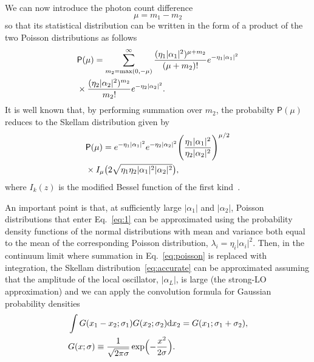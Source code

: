 \documentclass[%
reprint,
superscriptaddress,
 amsmath,amssymb,amsfonts,
 aps,
 pra,
 longbibliography
]{revtex4-2}
\newcommand{\prob}{\mathsf{P}}
\newcommand{\dd}{\mathrm{d}}
\begin{document}
We can now introduce the photon count difference
\begin{equation}
  \label{eq:dleta-m}
    \mu = m_1-m_2
  \end{equation}
  so that its statistical distribution %
  can be written in
  the form of a product of the two Poisson distributions as follows 
\begin{align}
  &
\label{eq:poisson}  
    \prob(\mu) =\sum_{m_2=\max(0,-\mu)}^{\infty}
    \frac{(\eta_1|\alpha_1|^2)^{\mu+m_2}}{(\mu+m_2)!}e^{-\eta_1|\alpha_1|^2}
    \notag
  \\
  &
    \times
\frac{(\eta_2|\alpha_2|^2)^{m_2}}{m_2!}e^{-\eta_2|\alpha_2|^2}.
\end{align}
It is well known that, by performing summation over $m_2$,
the probabilty $\prob(\mu)$ reduces to
the Skellam distribution given by~\cite{skellam1946frequency}
\begin{align}
  &
  \label{eq:accurate}
  \prob(\mu)=e^{-\eta_1|\alpha_1|^2}e^{-\eta_2|\alpha_2|^2}
    \Biggl(\frac{\eta_1|\alpha_1|^2}{\eta_2|\alpha_2|^2}\Biggr)^{\mu/2}
    \notag
  \\
  &
    \times
I_{\mu}\bigl(2\sqrt{\eta_1\eta_2|\alpha_1|^2|\alpha_2|^2}\bigr),
\end{align}
where $I_k(z)$ is the modified Bessel function of the first kind~\cite{NIST:hndbk:2010}.

An important point is that,
at sufficiently large
$|\alpha_1|$ and $|\alpha_2|$,
Poisson distributions that enter Eq.~\eqref{eq:1}
can be approximated using
the probability density functions of the normal distributions
with mean and variance both equal to the mean of
the corresponding Poisson distribution, $\lambda_i=\eta_i |\alpha_i|^2$.
Then, in the continuum limit where
summation in Eq.~\eqref{eq:poisson} is replaced with integration,
the Skellam distribution~\eqref{eq:accurate}
can be approximated assuming
that the amplitude of the local oscillator, $|\alpha_L|$, is large
(the strong-LO approximation) and
we can apply the convolution formula
for Gaussian probability densities
\begin{align}
  &
  \label{eq:convolution}
  \int G(x_1-x_2;\sigma_1)G(x_2;\sigma_2)\dd
    x_2=G(x_1;\sigma_1+\sigma_2),
  \\
  &
    \label{eq:G-notation}
    G(x;\sigma)\equiv\frac{1}{\sqrt{2\pi\sigma}}\exp\Bigl(-\frac{x^2}{2\sigma}\Bigr).
\end{align}
\end{document}
